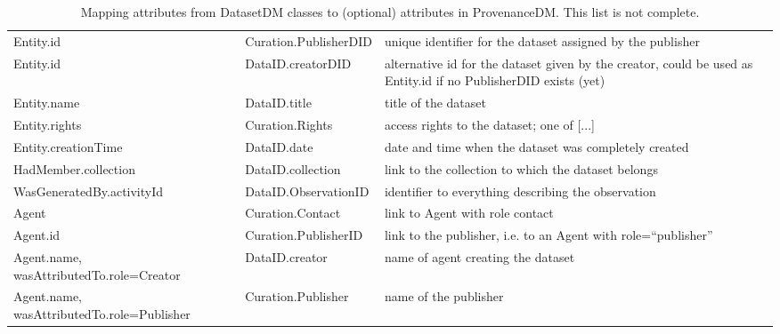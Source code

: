 \begin{table}[ht]
\small
{}\textwidth
\begin{tabulary}{1.0\textwidth}{@{}Llp{5cm}@{}}
\toprule
{} &  & \\
\midrule
Entity.id                & Curation.PublisherDID  & unique identifier for the dataset assigned by the publisher\\
Entity.id                & DataID.creatorDID      &  alternative id for the dataset given by the creator, could be used as Entity.id if no PublisherDID exists (yet)\\
Entity.name              & DataID.title           & title of the dataset\\
Entity.rights            & Curation.Rights        & access rights to the dataset; one of [...]\\
Entity.creationTime      & DataID.date            & date and time when the dataset was completely created\\
HadMember.collection     & DataID.collection     & link to the collection to which the dataset belongs\\
WasGeneratedBy.activityId & DataID.ObservationID  & identifier to everything describing the observation\\
Agent                    & Curation.Contact       & link to Agent with role contact\\
Agent.id                 & Curation.PublisherID   & link to the publisher, i.e. to an Agent with role=``publisher''\\
Agent.name, \newline wasAttributedTo.role=\newline Creator               & DataID.creator         & name of agent creating the dataset\\
Agent.name, \newline wasAttributedTo.role=\newline Publisher               & Curation.Publisher     & name of the publisher\\
\bottomrule
\end{tabulary}
\caption[Mapping attributes from DatasetDM classes to attributes in ProvenanceDM]{Mapping attributes from DatasetDM classes to (optional) attributes in ProvenanceDM. This list is not complete.}
\label{tab:datasetmapping}
\end{table}

